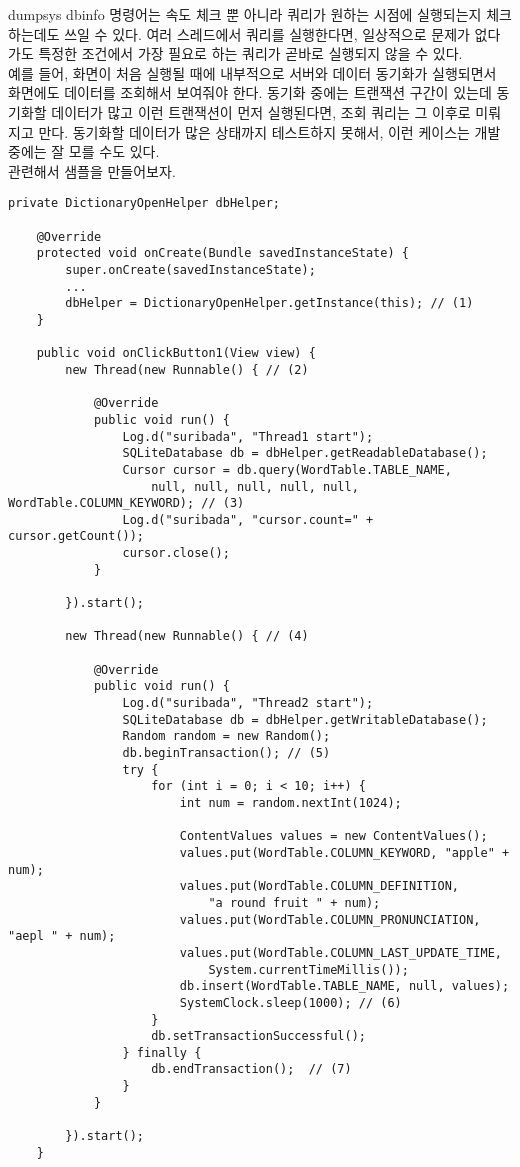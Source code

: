 dumpsys dbinfo 명령어는 속도 체크 뿐 아니라 쿼리가 원하는 시점에 실행되는지 체크하는데도 쓰일 수 있다.
여러 스레드에서 쿼리를 실행한다면, 일상적으로 문제가 없다가도 특정한 조건에서 가장 필요로 하는 쿼리가 곧바로 실행되지 않을 수 있다.\\

예를 들어, 화면이 처음 실행될 때에 내부적으로 서버와 데이터 동기화가 실행되면서 화면에도 데이터를 조회해서 보여줘야 한다. 
동기화 중에는 트랜잭션 구간이 있는데 동기화할 데이터가 많고 이런 트랜잭션이 먼저 실행된다면, 조회 쿼리는 그 이후로 미뤄지고 만다. 
동기화할 데이터가 많은 상태까지 테스트하지 못해서, 이런 케이스는 개발 중에는 잘 모를 수도 있다.\\

관련해서 샘플을 만들어보자.
\begin{lstlisting}[frame=single] 
	private DictionaryOpenHelper dbHelper;

	@Override
	protected void onCreate(Bundle savedInstanceState) {
		super.onCreate(savedInstanceState);
		...
		dbHelper = DictionaryOpenHelper.getInstance(this); // (1)
	}

	public void onClickButton1(View view) {
		new Thread(new Runnable() { // (2)

			@Override
			public void run() {
				Log.d("suribada", "Thread1 start");
				SQLiteDatabase db = dbHelper.getReadableDatabase();
				Cursor cursor = db.query(WordTable.TABLE_NAME, 
					null, null, null, null, null, WordTable.COLUMN_KEYWORD); // (3)
				Log.d("suribada", "cursor.count=" + cursor.getCount());
				cursor.close();
			}

		}).start();
		
		new Thread(new Runnable() { // (4)

			@Override
			public void run() {
				Log.d("suribada", "Thread2 start");
				SQLiteDatabase db = dbHelper.getWritableDatabase();
				Random random = new Random();
				db.beginTransaction(); // (5)
				try {
					for (int i = 0; i < 10; i++) {
						int num = random.nextInt(1024);

						ContentValues values = new ContentValues();
						values.put(WordTable.COLUMN_KEYWORD, "apple" + num);
						values.put(WordTable.COLUMN_DEFINITION, 
							"a round fruit " + num);
						values.put(WordTable.COLUMN_PRONUNCIATION, "aepl " + num);
						values.put(WordTable.COLUMN_LAST_UPDATE_TIME,
							System.currentTimeMillis());
						db.insert(WordTable.TABLE_NAME, null, values);
						SystemClock.sleep(1000); // (6)
					}
					db.setTransactionSuccessful();
				} finally {
					db.endTransaction();  // (7)
				}
			}

		}).start();
	}
\end{lstlisting}	
